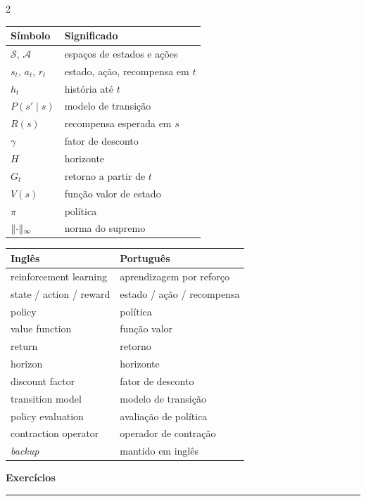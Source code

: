\documentclass[10pt, a4paper]{article}
\newcounter{secao}
\newcommand{\secao}[1]{%
  \stepcounter{secao}%
  \vspace{0.7em}%
  \noindent{\color{rlLaranja}\rule{1.6em}{2pt}}\hspace{0.5em}%
  {\color{rlCinza}\footnotesize\bfseries\thesecao}\hspace{0.35em}%
  {\color{rlAzul}\large\bfseries #1}%
  \par\vspace{-0.15em}%
  {\color{rlAzul!22}\rule{\linewidth}{0.6pt}}%
  \par\vspace{0.25em}}
\newcommand{\gS}{\mathcal{S}}
\newcommand{\gA}{\mathcal{A}}
\newcommand{\pol}{\pi}
\newcommand{\rec}{R}
\DeclarePairedDelimiter{\norm}{\lVert}{\rVert}
\newcommand{\norminf}[1]{\norm{#1}_{\infty}}
\begin{document}
\begin{multicols}{2}
{\footnotesize
\begin{tabular}{@{}l l@{}}
  \toprule
  \textbf{Símbolo} & \textbf{Significado} \\
  \midrule
  $\gS$, $\gA$ & espaços de estados e ações \\
  $s_t$, $a_t$, $r_t$ & estado, ação, recompensa em $t$ \\
  $h_t$ & história até $t$ \\
  $P(s'\mid s)$ & modelo de transição \\
  $\rec(s)$ & recompensa esperada em $s$ \\
  $\gamma$ & fator de desconto \\
  $H$ & horizonte \\
  $G_t$ & retorno a partir de $t$ \\
  $V(s)$ & função valor de estado \\
  $\pol$ & política \\
  $\norminf{\cdot}$ & norma do supremo \\
  \bottomrule
\end{tabular}}

\columnbreak

{\footnotesize
\begin{tabular}{@{}l l@{}}
  \toprule
  \textbf{Inglês} & \textbf{Português} \\
  \midrule
  reinforcement learning & aprendizagem por reforço \\
  state / action / reward & estado / ação / recompensa \\
  policy & política \\
  value function & função valor \\
  return & retorno \\
  horizon & horizonte \\
  discount factor & fator de desconto \\
  transition model & modelo de transição \\
  policy evaluation & avaliação de política \\
  contraction operator & operador de contração \\
  \emph{backup} & mantido em inglês \\
  \bottomrule
\end{tabular}}
\end{multicols}

\secao{Exercícios}
\end{document}
